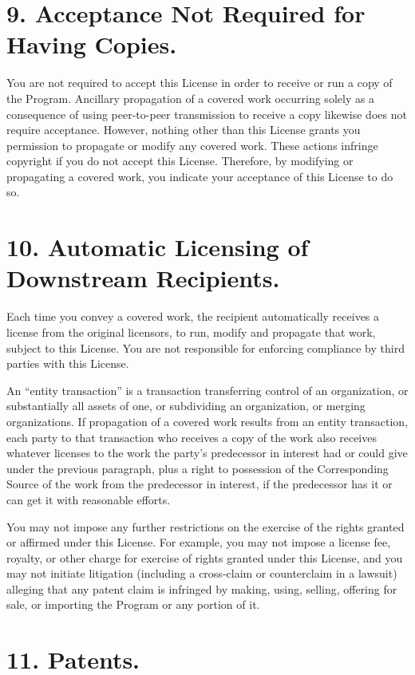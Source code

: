 \documentclass[11pt,a4paper]{article}
\begin{document}
\part*{9. Acceptance Not Required for Having Copies.}

You are not required to accept this License in order to receive or run a
copy of the Program. Ancillary propagation of a covered work occurring
solely as a consequence of using peer-to-peer transmission to receive a
copy likewise does not require acceptance. However, nothing other than
this License grants you permission to propagate or modify any covered
work. These actions infringe copyright if you do not accept this
License. Therefore, by modifying or propagating a covered work, you
indicate your acceptance of this License to do so.

\part*{10. Automatic Licensing of Downstream Recipients.}

Each time you convey a covered work, the recipient automatically
receives a license from the original licensors, to run, modify and
propagate that work, subject to this License. You are not responsible
for enforcing compliance by third parties with this License.

An “entity transaction” is a transaction transferring control of an
organization, or substantially all assets of one, or subdividing an
organization, or merging organizations. If propagation of a covered work
results from an entity transaction, each party to that transaction who
receives a copy of the work also receives whatever licenses to the work
the party's predecessor in interest had or could give under the previous
paragraph, plus a right to possession of the Corresponding Source of the
work from the predecessor in interest, if the predecessor has it or can
get it with reasonable efforts.

You may not impose any further restrictions on the exercise of the
rights granted or affirmed under this License. For example, you may not
impose a license fee, royalty, or other charge for exercise of rights
granted under this License, and you may not initiate litigation
(including a cross-claim or counterclaim in a lawsuit) alleging that any
patent claim is infringed by making, using, selling, offering for sale,
or importing the Program or any portion of it.

\part*{11. Patents.}
\end{document}
